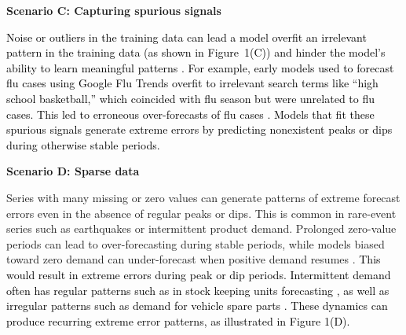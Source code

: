 \documentclass[]{interact}
\newcommand{\matt}[1]{\textcolor{black}{#1}}
\theoremstyle{plain}
\theoremstyle{definition}
\theoremstyle{remark}
\newenvironment{scenario}[1]{%
  \par\vspace{1ex}\noindent\textbf{#1}\par\vspace{0.5ex}}{\par}
\begin{document}
\begin{scenario}{Scenario C: Capturing spurious signals}
\matt{Noise or outliers in the training data can lead a model overfit an irrelevant pattern in the training data (as shown in Figure~1(C)) and hinder the model's ability to learn meaningful patterns \citep{cakmak2024}. For example, early models used to forecast flu cases using Google Flu Trends overfit to irrelevant search terms like ``high school basketball,'' which coincided with flu season but were unrelated to flu cases. This led to erroneous over-forecasts of flu cases \citep{lazer2014}. Models that fit these spurious signals generate extreme errors by predicting nonexistent peaks or dips during otherwise stable periods.}
\end{scenario}

\begin{scenario}{Scenario D: Sparse data}
Series with many missing or zero values can generate patterns of extreme forecast errors even in the absence of regular peaks or dips. This is common in rare-event series such as earthquakes or intermittent product demand. Prolonged zero-value periods can lead to over-forecasting during stable periods, while models biased toward zero demand can under-forecast when positive demand resumes \citep{wang2024b}. \matt{This would result in extreme errors during peak or dip periods. Intermittent demand often has regular patterns such as in stock keeping units forecasting \citep{nikolopoulos2021}, as well as irregular patterns such as demand for vehicle spare parts \citep{jiang2021}. These dynamics can produce recurring extreme error patterns, as illustrated in Figure 1(D).}
\end{scenario}
\end{document}
